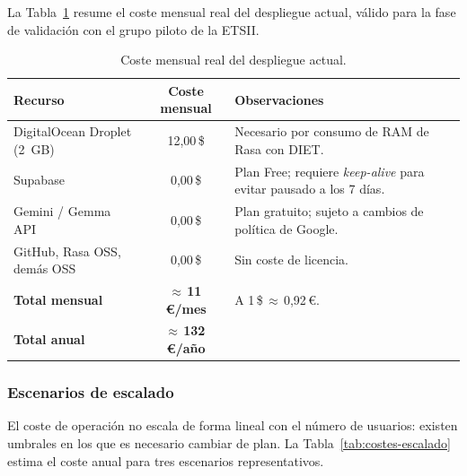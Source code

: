 La Tabla~\ref{tab:costes-actuales} resume el coste mensual real del despliegue actual, válido para la fase de validación con el grupo piloto de la ETSII.

\begin{table}[hbtp]
\centering
\small
\begin{tabular}{|l|c|p{6cm}|}
\hline
\textbf{Recurso} & \textbf{Coste mensual} & \textbf{Observaciones} \\ \hline
DigitalOcean Droplet (2~GB)     & 12,00\,\$ & Necesario por consumo de RAM de Rasa con DIET. \\ \hline
Supabase                        &  0,00\,\$ & Plan Free; requiere \textit{keep-alive} para evitar pausado a los 7 días. \\ \hline
Gemini / Gemma API              &  0,00\,\$ & Plan gratuito; sujeto a cambios de política de Google. \\ \hline
GitHub, Rasa OSS, demás OSS     &  0,00\,\$ & Sin coste de licencia. \\ \hline
\textbf{Total mensual}          & \textbf{$\approx$\,11\,€/mes} & A 1\,\$\,$\approx$\,0,92\,€. \\ \hline
\textbf{Total anual}            & \textbf{$\approx$\,132\,€/año} & \\ \hline
\end{tabular}
\caption{Coste mensual real del despliegue actual.}
\label{tab:costes-actuales}
\end{table}

\subsubsection{Escenarios de escalado}

El coste de operación no escala de forma lineal con el número de usuarios: existen umbrales en los que es necesario cambiar de plan. La Tabla~\ref{tab:costes-escalado} estima el coste anual para tres escenarios representativos.

